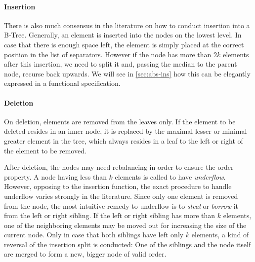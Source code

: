 \paragraph{Insertion}\label{par:intro-ins}
There is also much consensus in the literature on how to conduct insertion into a B-Tree.
\parencite{DBLP:journals/csur/Comer79}
Generally, an element is inserted into the nodes on the lowest level.
In case that there is enough space left, the element is simply placed at the correct
position in the list of separators.
However if the node has more than $2k$ elements after this insertion,
we need to split it and, passing the median to the parent node,
recurse back upwards.
We will see in \autoref{sec:abs-ins} how this can be
elegantly expressed in a functional specification.

\paragraph{Deletion}\label{par:intro-del}
On deletion, elements are removed from the leaves only.
If the element to be deleted resides in an inner node,
it is replaced by the maximal lesser or minimal greater
element in the tree, which always resides in a leaf
to the left or right of the element to be removed.

After deletion, the nodes may need rebalancing in order
to ensure the order property.
A node having less than $k$ elements is called to have \textit{underflow}.
However, opposing to the insertion function,
the exact procedure to handle underflow varies strongly in the literature.
Since only one element is removed from the node,
the most intuitive remedy to underflow is to \textit{steal} or \textit{borrow} it
from the left or right sibling.\parencite{DBLP:books/daglib/0023376}
If the left or right sibling has more than $k$ elements,
one of the neighboring elements may be moved out for increasing
the size of the current node.
Only in case that both siblings have left only $k$ elements,
a kind of reversal of the insertion split is conducted:
One of the siblings and the node itself are merged to form
a new, bigger node of valid order.


